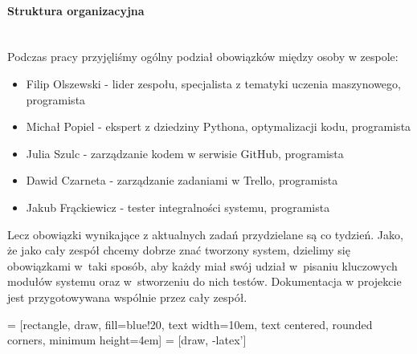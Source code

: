 \documentclass{article}
\begin{document}
\paragraph{Struktura organizacyjna}\mbox{}\\

Podczas pracy przyjęliśmy ogólny podział obowiązków między osoby w zespole:

\begin{itemize}
\item Filip Olszewski - lider zespołu, specjalista z tematyki uczenia maszynowego, programista
\item Michał Popiel - ekspert z dziedziny Pythona, optymalizacji kodu, programista
\item Julia Szulc - zarządzanie kodem w serwisie GitHub, programista
\item Dawid Czarneta - zarządzanie zadaniami w Trello, programista
\item Jakub Frąckiewicz - tester integralności systemu, programista
\end{itemize}
Lecz obowiązki wynikające z aktualnych zadań przydzielane są co tydzień. Jako, że jako cały zespół chcemy dobrze znać tworzony system, dzielimy się obowiązkami w~taki sposób, aby każdy miał swój udział w~pisaniu  kluczowych modułów systemu oraz w~stworzeniu do nich testów.
Dokumentacja w projekcie jest przygotowywana wspólnie przez cały zespół.

 = [rectangle, draw, fill=blue!20, 
    text width=10em, text centered, rounded corners, minimum height=4em]
 = [draw, -latex']
    
\newpage
\end{document}
